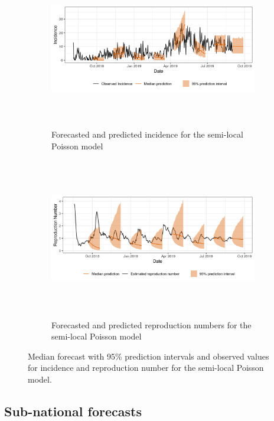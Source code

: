 \documentclass[12pt]{article}
\begin{document}
\begin{figure}[h!]
\begin{subfigure}{\textwidth}
  \centering
  \includegraphics[width=0.9\linewidth, height=7cm]{../output/national_predictions.png}  
  \caption{Forecasted and predicted incidence for the semi-local Poisson model}
  \label{fig:sub-first}
\end{subfigure}

\begin{subfigure}{\textwidth}
  \centering
  \includegraphics[width=0.9\linewidth, height=7cm]{../output/national_Rs.png}  
  \caption{Forecasted and predicted reproduction numbers for the semi-local Poisson model}
  \label{fig:sub-second}
\end{subfigure}
  \caption{Median forecast with 95\% prediction intervals and observed values for incidence and reproduction number for the semi-local Poisson model.}

  \label{fig:nat_pred}
\end{figure}

\subsection{Sub-national forecasts}
\end{document}
